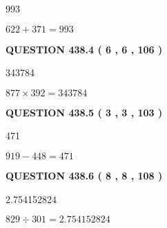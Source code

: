 \documentclass{ctexart}
\begin{document}
 
\noindent{}

993
 
 
 
 
\noindent{}

$ %
622 +  %
371=   %
993$
 
 
  
\vspace{0.2in}
  
{\textbf{\Large{QUESTION
438.4 
 ( 6 , 6 , 106 )
}}}
  
  
 
 
\noindent{}

343784
 
 
 
 
\noindent{}

$ %
877 \times  %
392=   %
343784$
 
 
  
\vspace{0.2in}
  
{\textbf{\Large{QUESTION
438.5 
 ( 3 , 3 , 103 )
}}}
  
  
 
 
\noindent{}

471
 
 
 
 
\noindent{}

$ %
919 -  %
448=   %
471$
 
 
  
\vspace{0.2in}
  
{\textbf{\Large{QUESTION
438.6 
 ( 8 , 8 , 108 )
}}}
  
  
 
 
\noindent{}

2.754152824
 
 
 
 
\noindent{}

$ %
829 \div  %
301=   %
2.754152824$
 
\end{document}
